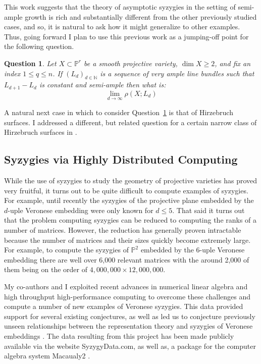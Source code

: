 \documentclass[10pt,reqno]{amsart}
\newtheorem{question}[lemma]{Question}
\theoremstyle{remark}
\newcommand{\N}{\mathbb{N}}
\renewcommand{\P}{\mathbb{P}}
\begin{document}
This work suggests that the theory of asymptotic syzygies in the setting of semi-ample growth is rich and substantially different from the other previously studied cases, and so, it is natural to ask how it might generalize to other examples. Thus, going forward I plan to use this previous work as a jumping-off point for the following question.  

\begin{question}\label{quest:semi-ample}
Let $X\subset \P^r$ be a smooth projective variety, $\dim X \geq2$, and fix an index $1\leq q \leq n$. If $(L_{d})_{d\in\N}$ is a sequence of very ample line bundles such that $L_{d+1}-L_{d}$ is constant and semi-ample then what is:
\[
\lim_{d\to\infty} \rho\left(X;L_{d}\right)
\]
\end{question}

A natural next case in which to consider Question~\ref{quest:semi-ample} is that of Hirzebruch surfaces. I addressed a different, but related question for a certain narrow class of Hirzebruch surfaces in \cite{bruce19-hirzebruch}.

\subsection{Syzygies via Highly Distributed Computing}

While the use of syzygies to study the geometry of projective varieties has proved very fruitful, it turns out to be quite difficult to compute examples of syzygies. For example, until recently the syzygies of the projective plane embedded by the $d$-uple Veronese embedding were only known for $d\leq 5$. That said it turns out that the problem computing syzygies can be reduced to computing the ranks of a number of matrices. However, the reduction has generally proven intractable because the number of matrices and their sizes quickly become extremely large. For example, to compute the syzygies of $\P^2$ embedded by the $6$-uple Veronese embedding there are well over 6,000 relevant matrices with the around 2,000 of them being on the order of $4,000,000 \times 12,000,000$. 

My co-authors and I exploited recent advances in numerical linear algebra and high throughput high-performance computing to overcome these challenges and compute a number of new examples of Veronese syzygies. This data provided support for several existing conjectures, as well as led us to conjecture previously unseen relationships between the representation theory and syzygies of Veronese embeddings \cite{bruceErmanGoldsteinYang18}. 
The data resulting from this project has been made publicly available via the website SyzygyData.com, as well as, a package for the computer algebra system Macaualy2 \cite{bruceErman19}.
\end{document}
